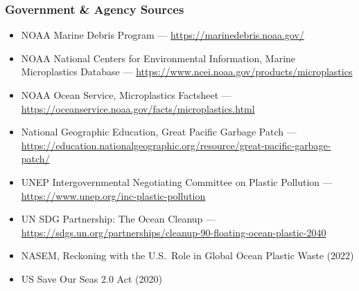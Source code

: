 \documentclass[11pt,letterpaper]{article}
\begin{document}
\subsubsection{Government \& Agency Sources}
\begin{itemize}[leftmargin=2em]
\item NOAA Marine Debris Program --- \url{https://marinedebris.noaa.gov/}
\item NOAA National Centers for Environmental Information, Marine Microplastics Database --- \url{https://www.ncei.noaa.gov/products/microplastics}
\item NOAA Ocean Service, Microplastics Factsheet --- \url{https://oceanservice.noaa.gov/facts/microplastics.html}
\item National Geographic Education, Great Pacific Garbage Patch --- \url{https://education.nationalgeographic.org/resource/great-pacific-garbage-patch/}
\item UNEP Intergovernmental Negotiating Committee on Plastic Pollution --- \url{https://www.unep.org/inc-plastic-pollution}
\item UN SDG Partnership: The Ocean Cleanup --- \url{https://sdgs.un.org/partnerships/cleanup-90-floating-ocean-plastic-2040}
\item NASEM, Reckoning with the U.S.\ Role in Global Ocean Plastic Waste (2022)
\item US Save Our Seas 2.0 Act (2020)
\end{itemize}
\end{document}
